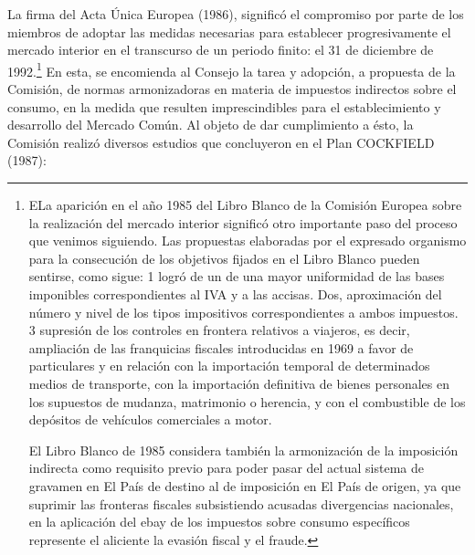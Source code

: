\documentclass[10pt,a4paper]{article}
\begin{document}
La firma del Acta Única Europea (1986), significó el compromiso por parte de los miembros de adoptar las medidas necesarias para establecer progresivamente el mercado interior en el transcurso de un periodo finito: el 31 de diciembre de 1992.\footnote{%
    ELa aparición en el año 1985 del Libro Blanco de la Comisión Europea sobre la realización del mercado interior significó otro importante paso del proceso que venimos siguiendo. Las propuestas elaboradas por el expresado organismo para la consecución de los objetivos fijados en el Libro Blanco pueden sentirse, como sigue:
1 logró de un de una mayor uniformidad de las bases imponibles correspondientes al IVA y a las accisas.
Dos, aproximación del número y nivel de los tipos impositivos correspondientes a ambos impuestos.
3 supresión de los controles en frontera relativos a viajeros, es decir, ampliación de las franquicias fiscales introducidas en 1969 a favor de particulares y en relación con la importación temporal de determinados medios de transporte, con la importación definitiva de bienes personales en los supuestos de mudanza, matrimonio o herencia, y con el combustible de los depósitos de vehículos comerciales a motor.

El Libro Blanco de 1985 considera también la armonización de la imposición indirecta como requisito previo para poder pasar del actual sistema de gravamen en El País de destino al de imposición en El País de origen, ya que suprimir las fronteras fiscales subsistiendo acusadas divergencias nacionales, en la aplicación del ebay de los impuestos sobre consumo específicos represente el aliciente la evasión fiscal y el fraude.
} En esta, se encomienda al Consejo la tarea y adopción, a propuesta de la Comisión, de normas armonizadoras en materia de impuestos indirectos sobre el consumo, en la medida que resulten imprescindibles para el establecimiento y desarrollo del Mercado Común. Al objeto de dar cumplimiento a ésto, la Comisión realizó diversos estudios que concluyeron en el Plan COCKFIELD (1987):
\end{document}
